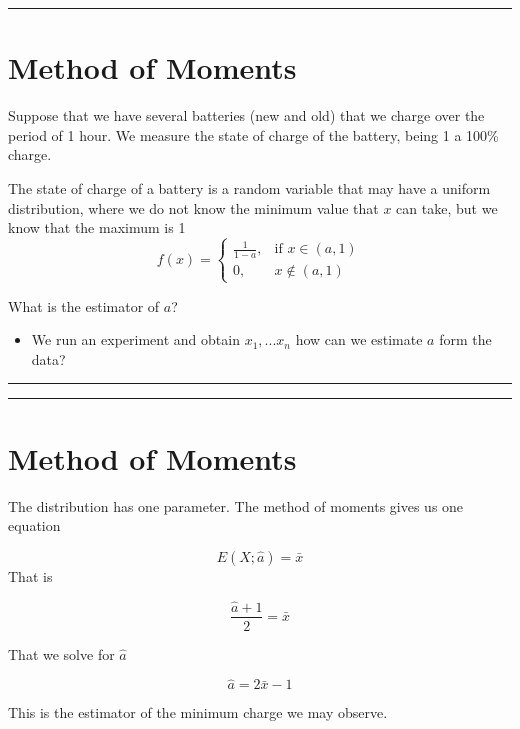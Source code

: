 \documentclass[
]{book}
\providecommand{\tightlist}{%
  \setlength{\itemsep}{0pt}\setlength{\parskip}{0pt}}
\begin{document}
\begin{center}\rule{0.5\linewidth}{0.5pt}\end{center}

\hypertarget{method-of-moments-3}{%
\section{Method of Moments}\label{method-of-moments-3}}

Suppose that we have several batteries (new and old) that we charge over the period of 1 hour. We measure the state of charge of the battery, being 1 a 100\% charge.

The state of charge of a battery is a random variable that may have a uniform distribution, where we do not know the minimum value that \(x\) can take, but we know that the maximum is 1
\[
f(x)=
\begin{cases}
    \frac{1}{1-a},& \text{if } x\in (a,1)\\
    0,& x\notin (a,1)
\end{cases}
\]

What is the estimator of \(a\)?

\begin{itemize}
\tightlist
\item
  We run an experiment and obtain \(x_1,...x_n\) how can we estimate \(a\) form the data?
\end{itemize}

\begin{center}\rule{0.5\linewidth}{0.5pt}\end{center}

\begin{center}\rule{0.5\linewidth}{0.5pt}\end{center}

\hypertarget{method-of-moments-4}{%
\section{Method of Moments}\label{method-of-moments-4}}

The distribution has one parameter. The method of moments gives us one equation

\[E(X; \hat{a})=\bar{x}\]
That is

\[\frac{\hat{a}+1}{2}=\bar{x}\]

That we solve for \(\hat{a}\)

\[\hat{a}=2\bar{x}-1\]

This is the estimator of the minimum charge we may observe.
\end{document}
